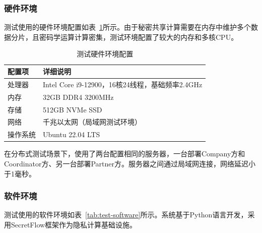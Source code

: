 \subsubsection{硬件环境}

测试使用的硬件环境配置如表~\ref{tab:test-hardware}所示。由于秘密共享计算需要在内存中维护多个数据分片，且密码学运算计算密集，测试环境配置了较大的内存和多核CPU。

\begin{table}[htbp]
    \centering
    \caption{测试硬件环境配置}
    \label{tab:test-hardware}
    \begin{tabular}{lp{8cm}}
        \toprule
        \textbf{配置项} & \textbf{详细说明} \\
        \midrule
        处理器 & Intel Core i9-12900，16核24线程，基础频率2.4GHz \\
        内存 & 32GB DDR4 3200MHz \\
        存储 & 512GB NVMe SSD \\
        网络 & 千兆以太网（局域网测试环境） \\
        操作系统 & Ubuntu 22.04 LTS \\
        \bottomrule
    \end{tabular}
\end{table}

在分布式测试场景下，使用了两台配置相同的服务器，一台部署Company方和Coordinator方、另一台部署Partner方。服务器之间通过局域网连接，网络延迟小于1毫秒。

\subsubsection{软件环境}

测试使用的软件环境如表~\ref{tab:test-software}所示。系统基于Python语言开发，采用SecretFlow框架作为隐私计算基础设施。

